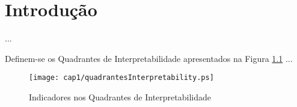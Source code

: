 
\chapter{Introdução}

...

Definem-se\cite{Gacto2011} os Quadrantes de Interpretabilidade apresentados na Figura \ref{fig:1-1} ...

\begin{figure} [h]
  \begin{center}
    \texttt{[image: cap1/quadrantesInterpretability.ps]}
    \caption{Indicadores nos Quadrantes de Interpretabilidade}\label{fig:1-1}
  \end{center}
\end{figure}
